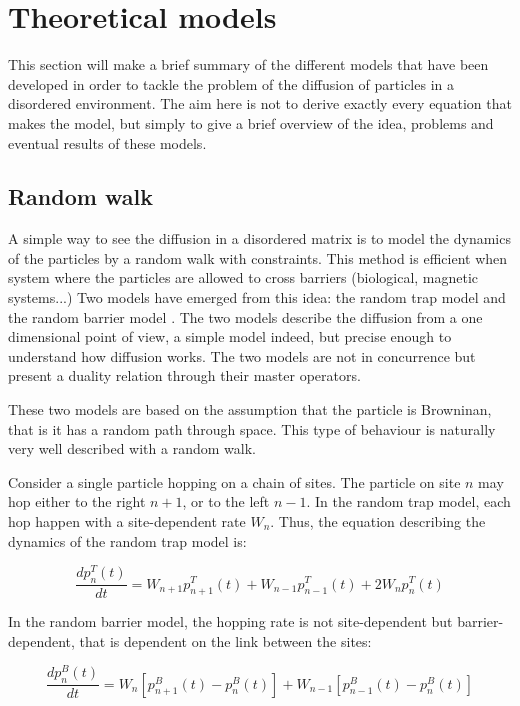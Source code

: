 \documentclass[a4paper,12pt]{article}
\newcommand{\jline}{\vspace{10pt}}
\begin{document}
\section{Theoretical models}
\label{theory}

This section will make a brief summary of the different models that have been developed in order to tackle the problem of the diffusion of particles in a disordered environment. The aim here is not to derive exactly every equation that makes the model, but simply to give a brief overview of the idea, problems and eventual results of these models.

\subsection{Random walk}
\label{random walk}

A simple way to see the diffusion in a disordered matrix is to model the dynamics of the particles by a random walk with constraints. This method is efficient when system where the particles are allowed to cross barriers (biological, magnetic systems...) Two models have emerged from this idea: the random trap model \cite{Haus1982} and the random barrier model \cite{Bernasconi1979,Jack2009}. The two models describe the diffusion from a one dimensional point of view, a simple model indeed, but precise enough to understand how diffusion works. The two models are not in concurrence but present a duality relation through their master operators.\jline

These two models are based on the assumption that the particle is Browninan, that is it has a random path through space. This type of behaviour is naturally very well described with a random walk.\jline

Consider a single particle hopping on a chain of sites. The particle on site $n$ may hop either to the right $n+1$, or to the left $n-1$. In the random trap model, each hop happen with a site-dependent rate $W_n$. Thus, the equation describing the dynamics of the random trap model is:

\begin{equation}
\frac{dp_n^T(t)}{dt}=W_{n+1}p_{n+1}^T(t)+W_{n-1}p_{n-1}^T(t)+2W_{n}p_{n}^T(t)
\end{equation}

In the random barrier model, the hopping rate is not site-dependent but barrier-dependent, that is dependent on the link between the sites:

\begin{equation}
\frac{dp_n^B(t)}{dt}=W_{n}\left[p_{n+1}^B(t)-p_{n}^B(t)\right]+W_{n-1}\left[p_{n-1}^B(t)-p_{n}^B(t)\right]
\end{equation}
\end{document}
